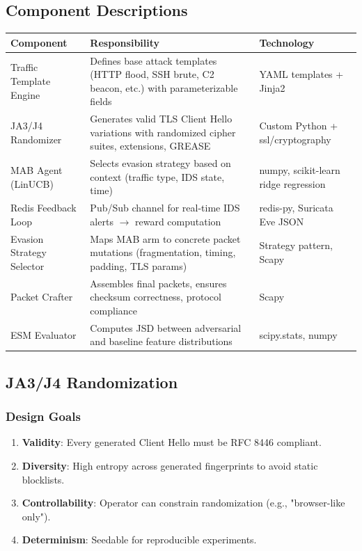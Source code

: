 \documentclass[review]{elsarticle}
\begin{document}
\subsection{Component Descriptions}
\begin{table}[htbp]
\small
\centering
\renewcommand{\arraystretch}{1.2}
\begin{tabular}{|p{2.6cm}|p{5.6cm}|p{2.8cm}|}
\hline
\textbf{Component} & \textbf{Responsibility} & \textbf{Technology} \\
\hline
Traffic Template Engine & Defines base attack templates (HTTP flood, SSH brute, C2 beacon, etc.) with parameterizable fields & YAML templates + Jinja2 \\
JA3/J4 Randomizer & Generates valid TLS Client Hello variations with randomized cipher suites, extensions, GREASE & Custom Python + ssl/cryptography \\
MAB Agent (LinUCB) & Selects evasion strategy based on context (traffic type, IDS state, time) & numpy, scikit-learn ridge regression \\
Redis Feedback Loop & Pub/Sub channel for real-time IDS alerts $\rightarrow$ reward computation & redis-py, Suricata Eve JSON \\
Evasion Strategy Selector & Maps MAB arm to concrete packet mutations (fragmentation, timing, padding, TLS params) & Strategy pattern, Scapy \\
Packet Crafter & Assembles final packets, ensures checksum correctness, protocol compliance & Scapy \\
ESM Evaluator & Computes JSD between adversarial and baseline feature distributions & scipy.stats, numpy \\
\hline
\end{tabular}
\end{table}

\subsection{JA3/J4 Randomization}
\subsubsection{Design Goals}
\begin{enumerate}
\item \textbf{Validity}: Every generated Client Hello must be RFC 8446 compliant.
\item \textbf{Diversity}: High entropy across generated fingerprints to avoid static blocklists.
\item \textbf{Controllability}: Operator can constrain randomization (e.g., "browser-like only").
\item \textbf{Determinism}: Seedable for reproducible experiments.
\end{enumerate}
\end{document}
